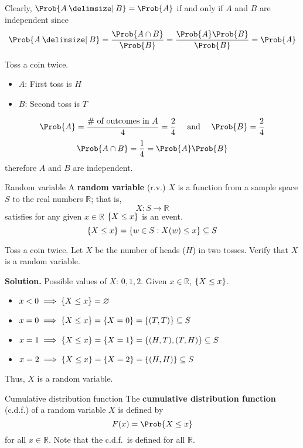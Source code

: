 Clearly, $ \Prob{A\given B}=\Prob{A} $ if and only if $ A $ and $ B $ are independent since
\[ \Prob{A\given B}=\frac{\Prob{A\cap B}}{\Prob{B}}=\frac{\Prob{A}\Prob{B}}{\Prob{B}}=\Prob{A}  \]

\begin{Example}{}{}
    Toss a coin twice.
    \begin{itemize}
        \item $ A $: First toss is $ H $
        \item $ B $: Second toss is $ T $
    \end{itemize}
    \[ \Prob{A}=\frac{\text{\# of outcomes in }A}{4}=\frac{2}{4}\quad
        \text{ and }\quad \Prob{B}=\frac{2}{4} \]
    \[ \Prob{A\cap B}=\frac{1}{4}=\Prob{A}\Prob{B} \]
    therefore $ A $ and $ B $ are independent.
\end{Example}

\begin{Definition}{Random variable}{}
    A \textbf{random variable} (r.v.) $ X $
    is a function from a sample space $ S $ to the real numbers $ \mathbb{R} $; that is,
    \[ X:S\to \mathbb{R} \] satisfies for any given $ x\in\mathbb{R} $
    $ \{X\le x\} $ is an event.
    \[ \{X\le x\}=\{w\in S:X(w)\le x\}
        \subseteq S \]
\end{Definition}

\begin{Example}{}{}
    Toss a coin twice. Let $ X $ be the number of heads ($ H $) in two tosses.
    Verify that $ X $ is a random variable.

    \textbf{Solution.}
    Possible values of $ X $: $ 0,1,2 $. Given $ x\in\mathbb{R} $,
    $ \{X\le x\} $.
    \begin{itemize}
        \item $ x<0 \implies \{X\le x\}=\varnothing $
        \item $ x=0 \implies \{X\le x\}=\{X=0\}=\{(T,T)\}\subseteq S$
        \item $ x=1 \implies \{X\le x\}=\{X=1\}=\{(H,T),(T,H)\}
                  \subseteq S $
        \item $ x=2 \implies \{X\le x\}=\{X=2\}=
                  \{(H,H)\}\subseteq S $
    \end{itemize}
    Thus, $ X $ is a random variable.
\end{Example}

\begin{Definition}{Cumulative distribution function}{}
    The \textbf{cumulative distribution function} (c.d.f.) of a random variable
    $ X $ is defined by
    \[ F(x)=\Prob{X\le x} \]
    for all $ x\in\mathbb{R} $. Note that the c.d.f.\ is defined for all $ \mathbb{R} $.
\end{Definition}

